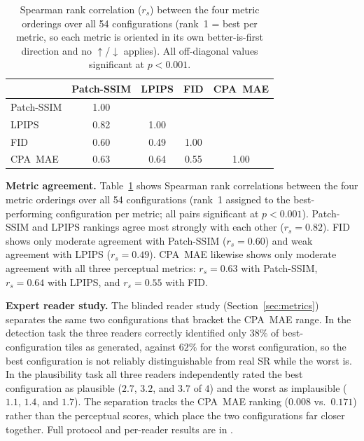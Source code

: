 \begin{table}[h!]
  \centering
  \caption{Spearman rank correlation ($r_s$) between the four metric orderings over
    all 54 configurations (rank~1 = best per metric, so each metric is oriented in its
    own better-is-first direction and no $\uparrow$/$\downarrow$ applies). All
    off-diagonal values significant at $p{<}0.001$.}
  \label{tab:ranking_correlation}
  \begin{tabular}{lcccc}
    \toprule
     & Patch-SSIM & LPIPS & FID & CPA~MAE \\
    \midrule
    Patch-SSIM & 1.00 & & & \\
    LPIPS      & 0.82 & 1.00 & & \\
    FID        & 0.60 & 0.49 & 1.00 & \\
    CPA~MAE    & 0.63 & 0.64 & 0.55 & 1.00 \\
    \bottomrule
  \end{tabular}
\end{table}

\noindent\textbf{Metric agreement.}
Table~\ref{tab:ranking_correlation} shows Spearman rank correlations between the four
metric orderings over all 54 configurations (rank~1 assigned to the best-performing
configuration per metric; all pairs significant at $p{<}0.001$).
Patch-SSIM and LPIPS rankings agree most strongly with each other ($r_s{=}0.82$).
FID shows only moderate agreement with Patch-SSIM ($r_s{=}0.60$) and weak agreement with LPIPS
($r_s{=}0.49$).
CPA~MAE likewise shows only moderate agreement with all three perceptual metrics:
$r_s{=}0.63$ with Patch-SSIM, $r_s{=}0.64$ with LPIPS, and $r_s{=}0.55$ with FID.

\noindent\textbf{Expert reader study.}
The blinded reader study (Section~\ref{sec:metrics}) separates the same two
configurations that bracket the CPA~MAE range.
In the detection task the three readers correctly identified only $38\%$ of
best-configuration tiles as generated, against $62\%$ for the worst configuration, so
the best configuration is not reliably distinguishable from real SR while the worst is.
In the plausibility task all three readers independently rated the best configuration as
plausible ($2.7$, $3.2$, and $3.7$ of $4$) and the worst as implausible ($1.1$, $1.4$,
and $1.7$).
The separation tracks the CPA~MAE ranking ($0.008$ vs.\ $0.171$) rather than the
perceptual scores, which place the two configurations far closer together.
Full protocol and per-reader results are in .

